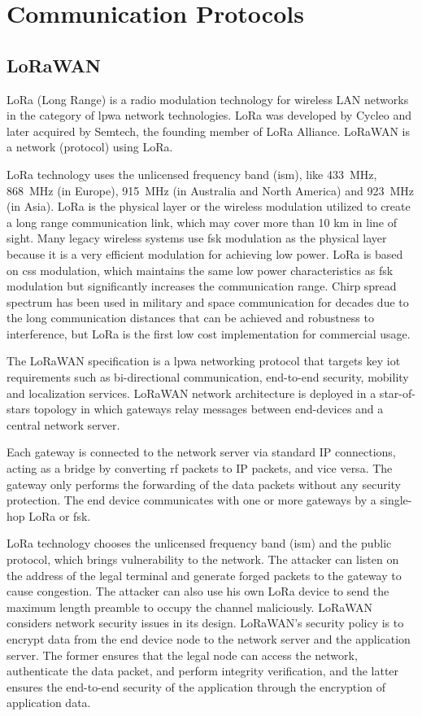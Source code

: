 \section{Communication Protocols}
\subsection{LoRaWAN}
LoRa (Long Range) is a radio modulation technology for wireless LAN networks in the category of \ac{lpwa} network technologies. LoRa was developed by Cycleo and later acquired by Semtech, the founding member of LoRa Alliance. LoRaWAN is a network (protocol) using LoRa. \cite{lora_alliance}

LoRa technology uses the unlicensed frequency band (\ac{ism}), like 433~MHz, 868~MHz (in Europe), 915~MHz (in Australia and North America) and 923~MHz (in Asia). LoRa is the physical layer or the wireless modulation utilized to create a long range communication link, which may cover more than 10 km in line of sight. Many legacy wireless systems use \ac{fsk} modulation as the physical layer because it is a very efficient modulation for achieving low power. LoRa is based on \ac{css} modulation, which maintains the same low power characteristics as \ac{fsk} modulation but significantly increases the communication range. Chirp spread spectrum has been used in military and space communication for decades due to the long 
communication distances that can be achieved and robustness to interference, but LoRa is the first low cost implementation for commercial usage. 


The LoRaWAN specification is a \ac{lpwa} networking protocol that targets key \ac{iot} requirements such as bi-directional communication, end-to-end security, mobility and localization services. LoRaWAN network architecture is deployed in a star-of-stars topology in which gateways relay messages between end-devices and a central network server.

Each gateway is connected to the network server via standard IP connections, acting as a bridge by converting \ac{rf} packets to IP packets, and vice versa. The gateway only performs the forwarding of the data packets without any security protection. The end device communicates with one or more gateways by a single-hop LoRa or \ac{fsk}.

LoRa technology chooses the unlicensed frequency band (\ac{ism}) and the public protocol, which brings vulnerability to the network. The attacker can listen on the address of the legal terminal and generate forged packets to the gateway to cause congestion. The attacker can also use his own LoRa device to send the maximum length preamble to occupy the channel maliciously. LoRaWAN considers network security issues in its design. LoRaWAN’s security policy is to encrypt data from the end device node to the network server and the application server. The former ensures that the legal node can access the network, authenticate the data packet, and perform integrity verification, and the latter ensures the end-to-end security of the application through the encryption of application data.




